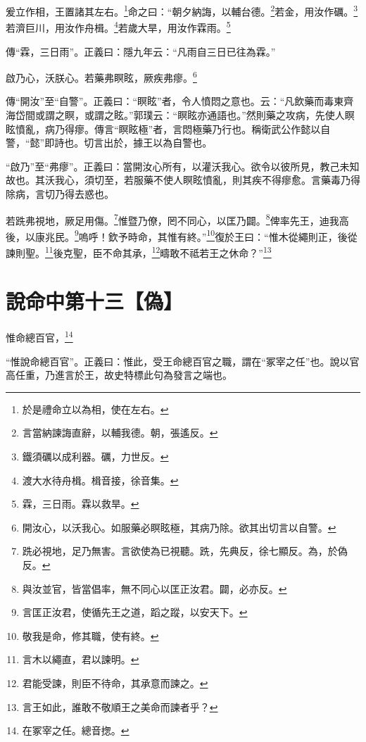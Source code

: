 爰立作相，王置諸其左右。\footnote{於是禮命立以為相，使在左右。}命之曰：“朝夕納誨，以輔台德。\footnote{言當納諫誨直辭，以輔我德。朝，張遙反。}若金，用汝作礪。\footnote{鐵須礪以成利器。礪，力世反。}若濟巨川，用汝作舟楫。\footnote{渡大水待舟楫。楫音接，徐音集。}若歲大旱，用汝作霖雨。\footnote{霖，三日雨。霖以救旱。}

{\noindent\zhuan{}\fzbyks 傳“霖，三日雨”。正義曰：隱九年云：“凡雨自三日已往為霖。” \par}

啟乃心，沃朕心。若藥弗瞑眩，厥疾弗瘳。\footnote{開汝心，以沃我心。如服藥必瞑眩極，其病乃除。欲其出切言以自警。}


{\noindent\zhuan{}\fzbyks 傳“開汝”至“自警”。正義曰：“瞑眩”者，令人憤悶之意也。云：“凡飲藥而毒東齊海岱間或謂之瞑，或謂之眩。”郭璞云：“瞑眩亦通語也。”然則藥之攻病，先使人瞑眩憤亂，病乃得瘳。傳言“瞑眩極”者，言悶極藥乃行也。稱衛武公作懿以自警，“懿”即詩也。切言出於，據王以為自警也。 \par}

{\noindent\shu{}\fzkt “啟乃”至“弗瘳”。正義曰：當開汝心所有，以灌沃我心。欲令以彼所見，教己未知故也。其沃我心，須切至，若服藥不使人瞑眩憤亂，則其疾不得瘳愈。言藥毒乃得除病，言切乃得去惑也。 \par}

若跣弗視地，厥足用傷。\footnote{跣必視地，足乃無害。言欲使為已視聽。跣，先典反，徐七顯反。為，於偽反。}惟暨乃僚，罔不同心，以匡乃闢。\footnote{與汝並官，皆當倡率，無不同心以匡正汝君。闢，必亦反。}俾率先王，迪我高後，以康兆民。\footnote{言匡正汝君，使循先王之道，蹈之蹤，以安天下。}嗚呼！欽予時命，其惟有終。”\footnote{敬我是命，修其職，使有終。}復於王曰：“惟木從繩則正，後從諫則聖。\footnote{言木以繩直，君以諫明。}後克聖，臣不命其承，\footnote{君能受諫，則臣不待命，其承意而諫之。}疇敢不祗若王之休命？”\footnote{言王如此，誰敢不敬順王之美命而諫者乎？}

\section{說命中第十三【偽】}

惟命總百官，\footnote{在冢宰之任。總音揔。}

{\noindent\shu{}\fzkt “惟說命總百官”。正義曰：惟此，受王命總百官之職，謂在“冢宰之任”也。說以官高任重，乃進言於王，故史特標此句為發言之端也。 \par}

